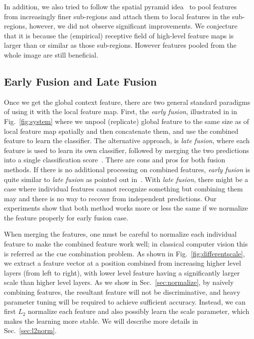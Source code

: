 \documentclass{article} %
\begin{document}
In addition, we also tried to follow the spatial pyramid idea~\cite{lazebnik2006beyond} to pool features from increasingly finer sub-regions and attach them to local features in the sub-regions, however, we did not observe significant improvements. We conjecture that it is because the (empirical) receptive field of high-level feature maps is larger than or similar as those sub-regions. However features pooled from the whole image are still beneficial.

\subsection{Early Fusion and Late Fusion}
\label{sec:earlylatefusion}
Once we get the global context feature, there are two general standard paradigms of using it with the local feature map. First, the \emph{early fusion}, illustrated in in Fig.~\ref{fig:system} where we unpool (replicate) global feature to the same size as of local feature map spatially and then concatenate them, and use the combined feature to learn the classifier. The alternative approach, is \emph{late fusion}, where each feature is used to learn its own classifier, followed by merging the two predictions into a single classification score~\cite{long2014fully, chen2014semantic}. There are cons and pros for both fusion methods. If there is no additional processing on combined features, \emph{early fusion} is quite similar to \emph{late fusion} as pointed out in~\cite{hariharan2014hypercolumns}. With \emph{late fusion}, there might be a case where individual features cannot recognize something but combining them may and there is no way to recover from independent predictions. Our experiments show that both method works more or less the same if we normalize the feature properly for early fusion case.

When merging the features, one must be careful to normalize each individual feature to make the combined feature work well; in classical computer vision this is referred as the cue combination problem. As shown in Fig.~\ref{fig:differentscale}, we extract a feature vector at a position combined from increasing higher level layers (from left to right), with lower level feature having a significantly larger scale than higher level layers. As we show in Sec.~\ref{sec:normalize}, by naively combining features, the resultant feature will not be discriminative, and heavy parameter tuning will be required to achieve sufficient accuracy. Instead, we can first $L_2$ normalize each feature and also possibly learn the scale parameter, which makes the learning more stable. We will describe more details in Sec.~\ref{sec:l2norm}.
\end{document}
